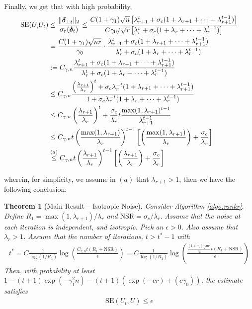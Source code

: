 \documentclass[10pt]{article}
\newtheorem{theorem}{Theorem}
\newcommand{\nsrmax}{\text{NSR}}
\newcommand{\SE}{\mathrm{SE}}
\begin{document}
Finally, we get that with high probability,  
\begin{align*}
\SE(U_,U_t) &\leq \frac{\|\utsin_t\|_2}{\sigma_r(\utcos_t)} \leq \frac{C (1+ \gamma_1) \sqrt{n} \left[\lambda_{r+1}^t +  \sigma_c (1 + \lambda_{r+1} + \cdots +  \lambda_{r+1}^{t-1}) \right]}{C \gamma_0/\sqrt{r} \left[ \lambda_r^t + \sigma_c (1 + \lambda_r + \cdots + \lambda_r^{t-1})\right]} \\
&= \frac{C (1+ \gamma_1) \sqrt{nr}}{\gamma_0} \cdot \frac{\lambda_{r+1}^t +  \sigma_c (1 + \lambda_{r+1} + \cdots +  \lambda_{r+1}^{t-1})}{\lambda_r^t + \sigma_c (1 + \lambda_r + \cdots + \lambda_r^{t-1})} \\
&:= C_{\gamma,n} \frac{\lambda_{r+1}^t +  \sigma_c (1 + \lambda_{r+1} + \cdots +  \lambda_{r+1}^{t-1})}{\lambda_r^t + \sigma_c (1 + \lambda_r + \cdots + \lambda_r^{t-1})}\\
&\leq C_{\gamma,n} \frac{\left(\frac{\lambda_{r+1}}{\lambda_r}\right)^t +  \sigma_c \lambda_r^{-t} (1 + \lambda_{r+1} + \cdots +  \lambda_{r+1}^{t-1})}{1 + \sigma_c \lambda_r^{-t} (1 + \lambda_r + \cdots + \lambda_r^{t-1})} \\
&\leq C_{\gamma,n} \left(\frac{\lambda_{r+1}}{\lambda_r}\right)^t + \frac{\sigma_c}{\lambda_r} t \frac{\max(1, \lambda_{r+1})^{t-1}}{\lambda_{r+1}^{t-1}}\\
&\leq C_{\gamma,n} t \left( \frac{\max(1, \lambda_{r+1})}{\lambda_{r}}\right)^{t-1} \left[ \left(\frac{\max(1,\lambda_{r+1})}{\lambda_r}\right) + \frac{\sigma_c}{\lambda_r} \right] \\
&\overset{(a)}{\leq} C_{\gamma,n} t \left( \frac{\lambda_{r+1}}{\lambda_{r}}\right)^{t-1} \left[ \left(\frac{\lambda_{r+1}}{\lambda_r}\right) + \frac{\sigma_c}{\lambda_r} \right]
\end{align*}

wherein, for simplicity, we assume in $(a)$ that $\lambda_{r+1} > 1$, then we have the following conclusion:

\begin{theorem}[Main Result -- Isotropic Noise]
Consider Algorithm \ref{algo:rankr}.
Define $R_1 = \max(1, \lambda_{r+1})/\lambda_r$ and $\nsrmax = \sigma_c/\lambda_r$. 
Assume that the noise at each iteration is independent, and isotropic. Pick an $\epsilon > 0$. Also assume that $\lambda_r > 1$.  Assume that the number of iterations, $t > t^* - 1$ with
\begin{align*}
t^* = C \frac{1}{\log(1/R_1)} \log   \left( \frac{C_{\gamma,n} t (R_1 + \nsrmax)}{\epsilon}\right) = C \frac{1}{\log(1/R_1)} \log   \left( \frac{\frac{(1+ \gamma_1)\sqrt{nr}}{\gamma_0} t (R_1 + \nsrmax)}{\epsilon}\right)
\end{align*}
 Then, with probability at least $1 - (t + 1) \exp(- \gamma_1^2 n) - (t+1) (\exp(-cr) + (c\gamma_0))$, the estimate satisfies
 \begin{align*}
 \SE(U_t, U) \leq \epsilon
 \end{align*}
\end{theorem}
\end{document}
